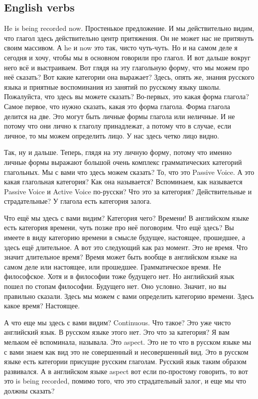 \documentclass[main.tex]{subfiles}
\begin{document}
\subsection{English verbs}

He is being recorded now.
Простенькое предложение.
И мы действительно видим, что глагол здесь действительно центр притяжения.
Он не может нас не притянуть своим массивом.
А he и now это так, чисто чуть-чуть.
Но и на самом деле я сегодня и хочу, чтобы мы в основном говорили про глагол.
И вот дальше вокруг него всё и выстраиваем.
Вот глядя на эту глагольную форму, что мы можем про неё сказать?
Вот какие категории она выражает?
Здесь, опять же, знания русского языка и приятные воспоминания из занятий по русскому языку школы.
Пожалуйста, что здесь вы можете сказать?
Во-первых, это какая форма глагола?
Самое первое, что нужно сказать, какая это форма глагола.
Форма глагола делится на две.
Это могут быть личные формы глагола или неличные.
И не потому что они лично к глаголу принадлежат, а потому что в случае, если личное, то мы можем определить лицо.
У нас здесь четко лицо видно.

Так, ну и дальше.
Теперь, глядя на эту личную форму, потому что именно личные формы выражают большой очень комплекс грамматических категорий глагольных.
Мы с вами что здесь можем сказать?
То, что это Passive Voice.
А это какая глагольная категория?
Как она называется?
Вспоминаем, как называется Passive Voice и Active Voice по-русски?
Что это за категория?
Действительные и страдательные?
У глагола есть категория залога.

Что ещё мы здесь с вами видим?
Категория чего?
Времени!
В английском языке есть категория времени, чуть позже про неё поговорим.
Что ещё здесь?
Вы имеете в виду категорию времени в смысле будущее, настоящее, прошедшее, а здесь ещё длительное.
А вот это следующий как раз момент.
Это не время.
Что значит длительное время?
Время может быть вообще в английском языке на самом деле или настоящее, или прошедшее.
Грамматическое время.
Не философское.
Хотя и в философии тоже будущего нет.
Но английский язык пошел по стопам философии.
Будущего нет.
Оно условно.
Значит, но вы правильно сказали.
Здесь мы можем с вами определить категорию времени.
Здесь какое время?
Настоящее.

А что еще мы здесь с вами видим? Continuous.
Что такое?
Это уже чисто английский язык.
В русском языке этого нет.
Это что за категория?
Я вам мельком её вспоминала, называла.
Это aspect.
Это не то что в русском языке мы с вами знаем как вид это не совершенный и несовершенный вид.
Это в русском языке есть категории присущие русским глаголам.
Русский язык таким образом развивался.
А в английском языке aspect вот если по-простому говорить, то вот это is being recorded, помимо того, что это страдательный залог, и еще мы что должны сказать?
\end{document}
